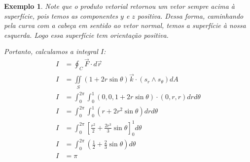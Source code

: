 \documentclass{article}
\newcommand{\doubleint}[2] {\iint\limits_{#1} #2}
\newtheorem{example}{Exemplo}[section]
\begin{document}
\begin{example}
                Note que o produto vetorial retornou um vetor sempre acima à superfície, pois temos as componentes
                $y$ e $z$ positiva. Dessa forma, caminhando pela curva com a cabeça em sentido ao vetor normal,
                temos a superfície à nossa esquerda. Logo essa superfície tem orientação positiva.

                Portanto, calculamos a integral $I$:
                \begin{align*}
                    I &= \oint_C \vec{F} \cdot d\vec{r}\\
                    I &= \doubleint{S}{(1 + 2r\sin\theta)\vec{k} \cdot (s_r \wedge s_\theta) dA}\\
                    I &= \int_0^{2\pi} \int_0^1 (0, 0, 1 + 2r\sin\theta) \cdot (0, r, r) dr d\theta\\
                    I &= \int_0^{2\pi} \int_0^1 (r + 2r^2\sin\theta) dr d\theta\\
                    I &= \int_0^{2\pi} \left[\frac{r^2}{2} + \frac{2r^3}{3} \sin\theta \right]_0^1 d\theta\\
                    I &= \int_0^{2\pi} \left( \frac{1}{2} + \frac{2}{3} \sin\theta \right) d\theta\\
                    I &= \pi\\
                \end{align*}
            \end{example}
           
\end{document}
